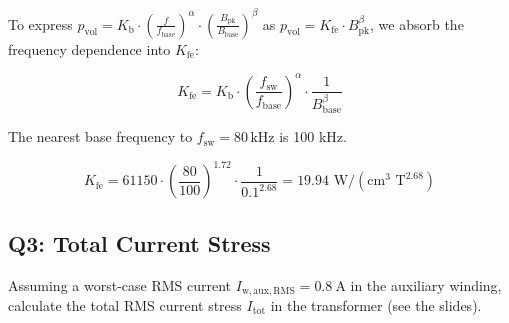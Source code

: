 \documentclass{PELsmallreport}
\begin{document}
\begin{framed}
	\vspace{2em}

To express $p_\mathrm{vol} = K_\mathrm{b} \cdot \left(\frac{f}{f_\mathrm{base}}\right)^{\alpha} \cdot \left(\frac{B_\mathrm{pk}}{B_\mathrm{base}}\right)^{\beta}$ as $p_\mathrm{vol} = K_\mathrm{fe} \cdot B_\mathrm{pk}^{\beta}$, we absorb the frequency dependence into $K_\mathrm{fe}$:

$$K_\mathrm{fe} = K_\mathrm{b} \cdot \left(\frac{f_\mathrm{sw}}{f_\mathrm{base}}\right)^{\alpha} \cdot \frac{1}{B_\mathrm{base}^{\beta}}$$

The nearest base frequency to $f_\mathrm{sw} = 80\,\mathrm{kHz}$ is 100 kHz.

$$K_\mathrm{fe} = 61150 \cdot \left(\frac{80}{100}\right)^{1.72} \cdot \frac{1}{0.1^{2.68}} = 19.94 \text{ W} / (\text{cm}^3 \text{ T}^{2.68})$$
	\vspace{2em}
\end{framed}

 \hfill{}





\subsection{Q3: Total Current Stress} 
Assuming a worst-case RMS current  $I_{\mathrm{w,aux,RMS}} = \qty{0.8}{\A}$ in the auxiliary winding, calculate the total RMS current stress $I_{\mathrm{tot}}$ in the transformer (see the slides). 
\\

 \hfill{}
\end{document}
